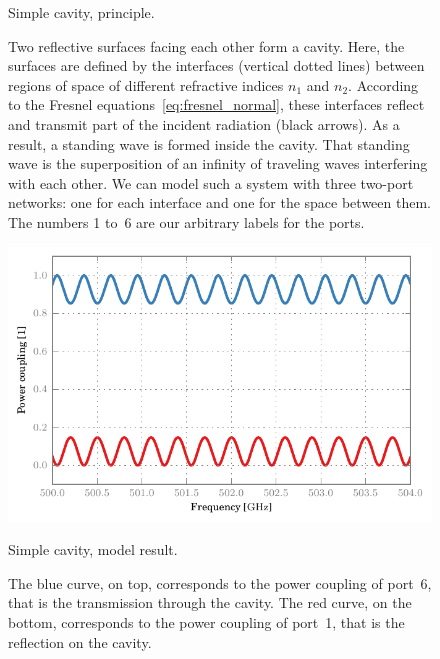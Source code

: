 \begin{figure}[hbtp]
    \centering
    
    \caption{Simple cavity, principle.}
    \caption*{
        Two reflective surfaces facing each other form a cavity.
        Here, the surfaces are defined by the interfaces (vertical dotted lines)
        between regions of space of different refractive indices $n_1$ and $n_2$.
        According to the Fresnel equations~\eqref{eq:fresnel_normal}, these interfaces
        reflect and transmit part of the incident radiation (black arrows).
        As a result, a standing wave is formed inside the cavity.
        That standing wave is the superposition of an infinity of traveling waves
        interfering with each other.
        We can model such a system with three two-port networks:
        one for each interface and one for the space between them.
        The numbers 1 to~6 are our arbitrary labels for the ports.
    }
    \label{fig:simple_cavity_principle}
\end{figure}
\begin{figure}[hbtp]
    \centering
    \includegraphics{simple_cavity_direct}
    \caption{Simple cavity, model result.}
    \caption*{
        The blue curve, on top, corresponds to the power coupling of port~6,
        that is the transmission through the cavity.
        The red curve, on the bottom, corresponds to the power coupling of port~1,
        that is the reflection on the cavity.
    }
    \label{fig:simple_cavity_direct}
\end{figure}

